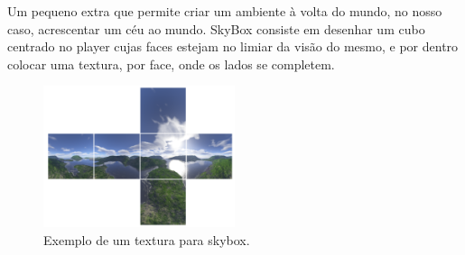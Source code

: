 
Um pequeno extra que permite criar um ambiente à volta do mundo, no nosso caso, acrescentar um céu ao mundo. SkyBox consiste em desenhar um cubo centrado no player cujas faces estejam no limiar da visão do mesmo, e por dentro colocar uma textura, por face, onde os lados se completem.

\-

\begin{figure}[h]
\begin{center}
\includegraphics[width=0.5\textwidth]{images/skybox.png}
\caption{Exemplo de um textura para skybox.}
\end{center}
\end{figure}